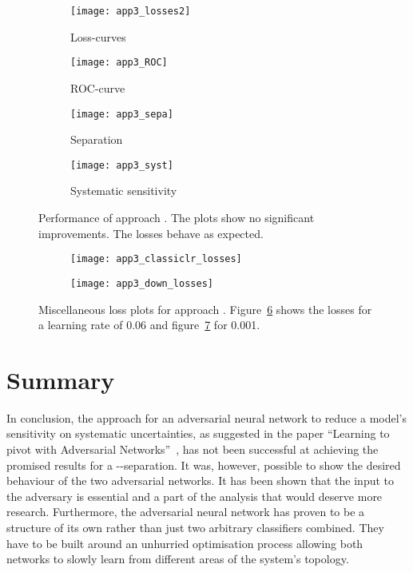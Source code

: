 \begin{figure}[htbp]
    \centering
    \begin{subfigure}[b]{0.45\textwidth}
        \texttt{[image: app3\_losses2]}
        \caption{Loss-curves}
        \label{fig:app3:losses}
    \end{subfigure}
\quad
    \begin{subfigure}[b]{0.45\textwidth}
        \texttt{[image: app3\_ROC]}
        \caption{ROC-curve}
        \label{fig:app3:ROC}
    \end{subfigure}

    \begin{subfigure}[b]{0.45\textwidth}
		\texttt{[image: app3\_sepa]}
		\caption{Separation}
		\label{fig:app3:sepa}
	\end{subfigure}
\quad
	\begin{subfigure}[b]{0.45\textwidth}
		\texttt{[image: app3\_syst]}
		\caption{Systematic sensitivity}
		\label{fig:app3:syst}
	\end{subfigure}
    \caption[ANN results approach ]{Performance of approach . The plots show no significant improvements. The losses behave as expected.}
	\label{fig:app3}
\end{figure}

\begin{figure}[htbp]
    \centering
    \begin{subfigure}[b]{0.45\textwidth}
        \texttt{[image: app3\_classiclr\_losses]}
        \caption{}
        \label{fig:app3:classiclr:losses}
    \end{subfigure}
\quad
    \begin{subfigure}[b]{0.45\textwidth}
        \texttt{[image: app3\_down\_losses]}
        \caption{}
        \label{fig:app3:down:losses}
    \end{subfigure}
    \caption[Misc plots approach ]{Miscellaneous loss plots for approach . Figure~\ref{fig:app3:classiclr:losses} shows the losses for a learning rate of \num{0.06} and figure~\ref{fig:app3:down:losses} for \num{0.001}.}
	\label{fig:app3:misc}
\end{figure}
\section{Summary}

In conclusion, the approach for an adversarial neural network to reduce a model's sensitivity on systematic uncertainties, as suggested in the paper \enquote{Learning to pivot with Adversarial Networks}~\cite{Louppe:2016ylz}, has not been successful at achieving the promised results for a \tW-\ttbar-separation. It was, however, possible to show the desired behaviour of the two adversarial networks. It has been shown that the input to the adversary is essential and a part of the analysis that would deserve more research. Furthermore, the adversarial neural network has proven to be a structure of its own rather than just two arbitrary classifiers combined. They have to be built around an unhurried optimisation process allowing both networks to slowly learn from different areas of the system's topology.
